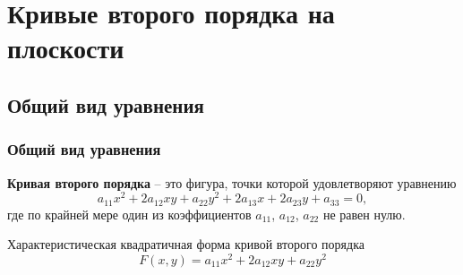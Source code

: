 \documentclass[10pt]{beamer}
\begin{document}
    \section{Кривые второго порядка на плоскости}
    \subsection{Общий вид уравнения}
    \begin{frame}
        \frametitle{Общий вид уравнения}
        \textbf{Кривая второго порядка} -- это фигура, точки которой удовлетворяют уравнению
        \begin{equation}
            a_{11}x^2 + 2a_{12}xy+a_{22}y^2 + 2a_{13}x + 2a_{23}y + a_{33} = 0,
        \end{equation}
        где по крайней мере один из коэффициентов $a_{11}$, $a_{12}$, $a_{22}$ не равен нулю.

        Характеристическая квадратичная форма кривой второго порядка 
        \begin{equation}
            F(x,y) = a_{11}x^2 + 2a_{12}xy+a_{22}y^2
        \end{equation}
    \end{frame}
\end{document}
